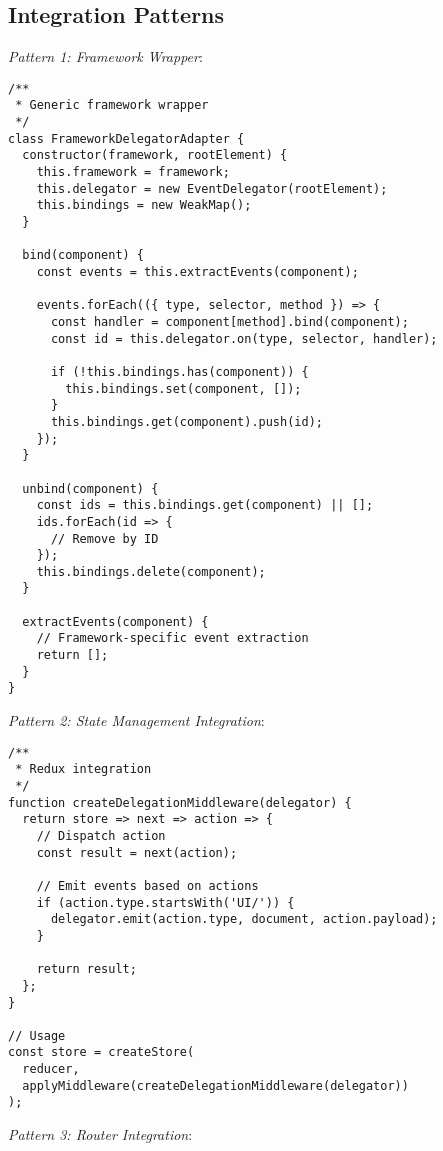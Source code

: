 \documentclass[11pt]{article}
\begin{document}
\subsection{Integration Patterns}
\label{sec:org5dddb5e}

\emph{Pattern 1: Framework Wrapper}:

\begin{verbatim}
/**
 * Generic framework wrapper
 */
class FrameworkDelegatorAdapter {
  constructor(framework, rootElement) {
    this.framework = framework;
    this.delegator = new EventDelegator(rootElement);
    this.bindings = new WeakMap();
  }
  
  bind(component) {
    const events = this.extractEvents(component);
    
    events.forEach(({ type, selector, method }) => {
      const handler = component[method].bind(component);
      const id = this.delegator.on(type, selector, handler);
      
      if (!this.bindings.has(component)) {
        this.bindings.set(component, []);
      }
      this.bindings.get(component).push(id);
    });
  }
  
  unbind(component) {
    const ids = this.bindings.get(component) || [];
    ids.forEach(id => {
      // Remove by ID
    });
    this.bindings.delete(component);
  }
  
  extractEvents(component) {
    // Framework-specific event extraction
    return [];
  }
}
\end{verbatim}

\emph{Pattern 2: State Management Integration}:

\begin{verbatim}
/**
 * Redux integration
 */
function createDelegationMiddleware(delegator) {
  return store => next => action => {
    // Dispatch action
    const result = next(action);
    
    // Emit events based on actions
    if (action.type.startsWith('UI/')) {
      delegator.emit(action.type, document, action.payload);
    }
    
    return result;
  };
}

// Usage
const store = createStore(
  reducer,
  applyMiddleware(createDelegationMiddleware(delegator))
);
\end{verbatim}

\emph{Pattern 3: Router Integration}:
\end{document}
